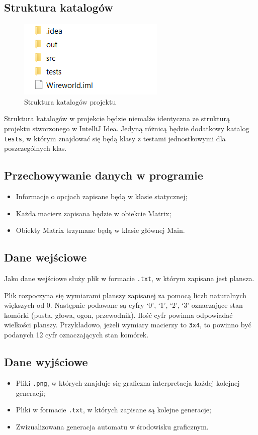 \documentclass[a4paper,12pt]{article}
\begin{document}
\subsection{Struktura katalogów}
\begin{figure}[H]
	\centering
	\includegraphics{CatalogueStruct.png}
	\caption{Struktura katalogów projektu}
\end{figure}
Struktura katalogów w projekcie będzie niemalże identyczna ze strukturą projektu stworzonego w IntelliJ Idea. Jedyną różnicą będzie dodatkowy katalog \texttt{tests}, w którym znajdować się będą klasy z testami jednostkowymi dla poszczególnych klas.


\subsection{Przechowywanie danych w programie}
\begin{itemize}
\item Informacje o opcjach zapisane będą w klasie statycznej;
\item Każda macierz zapisana będzie w obiekcie Matrix;
\item Obiekty Matrix trzymane będą w klasie głównej Main.
\end{itemize}

\subsection{Dane wejściowe}
Jako dane wejściowe służy plik w formacie \texttt{.txt}, w którym zapisana jest plansza.

Plik rozpoczyna się wymiarami planszy zapisanej za pomocą liczb naturalnych większych od 0. Następnie podawane są cyfry `0', `1', `2', `3' oznaczające stan komórki (pusta, głowa, ogon, przewodnik). Ilość cyfr powinna odpowiadać wielkości planszy. Przykładowo, jeżeli wymiary macierzy to \texttt{3x4}, to powinno być podanych 12 cyfr oznaczających stan komórek.

\subsection{Dane wyjściowe}
\begin{itemize}
\item Pliki \texttt{.png}, w których znajduje się graficzna interpretacja każdej kolejnej generacji;
\item Pliki w formacie \texttt{.txt}, w których zapisane są kolejne generacje;
\item Zwizualizowana generacja automatu w środowisku graficznym.
\end{itemize}
\end{document}
